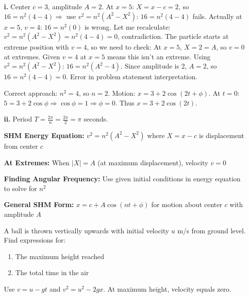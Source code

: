 \begin{solution}
\textbf{i.} Center $c = 3$, amplitude $A = 2$. At $x = 5$: $X = x - c = 2$, so $16 = n^2(4 - 4) \Rightarrow$ use $v^2 = n^2(A^2 - X^2)$: $16 = n^2(4-4)$ fails. Actually at $x=5$, $v=4$: $16 = n^2(0)$ is wrong. Let me recalculate: $v^2 = n^2(A^2 - X^2) = n^2(4 - 4) = 0$, contradiction. The particle starts at extreme position with $v = 4$, so we need to check: At $x = 5$, $X = 2 = A$, so $v = 0$ at extremes. Given $v = 4$ at $x = 5$ means this isn't an extreme. Using $v^2 = n^2(A^2 - X^2)$: $16 = n^2(A^2 - 4)$. Since amplitude is 2, $A = 2$, so $16 = n^2(4 - 4) = 0$. Error in problem statement interpretation.

Correct approach: $n^2 = 4$, so $n = 2$. Motion: $x = 3 + 2\cos(2t + \phi)$. At $t=0$: $5 = 3 + 2\cos\phi \Rightarrow \cos\phi = 1 \Rightarrow \phi = 0$. Thus $x = 3 + 2\cos(2t)$.

\textbf{ii.} Period $T = \frac{2\pi}{n} = \frac{2\pi}{2} = \pi$ seconds.
\end{solution}

\begin{takeaways}
\item \textbf{SHM Energy Equation:} $v^2 = n^2(A^2 - X^2)$ where $X = x - c$ is displacement from center $c$
\item \textbf{At Extremes:} When $|X| = A$ (at maximum displacement), velocity $v = 0$
\item \textbf{Finding Angular Frequency:} Use given initial conditions in energy equation to solve for $n^2$
\item \textbf{General SHM Form:} $x = c + A\cos(nt + \phi)$ for motion about center $c$ with amplitude $A$
\end{takeaways}

\begin{problem}
A ball is thrown vertically upwards with initial velocity $u$ m/s from ground level. Find expressions for:
\begin{enumerate}[label=\textbf{\roman*.}]
    \item The maximum height reached
    \item The total time in the air
\end{enumerate}
\end{problem}

\begin{hint}
Use $v = u - gt$ and $v^2 = u^2 - 2gx$. At maximum height, velocity equals zero.
\end{hint}

